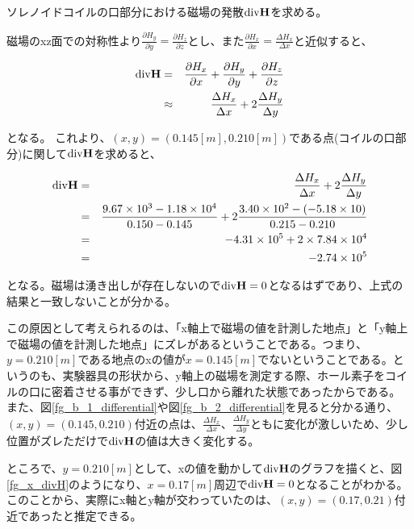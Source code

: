 \documentclass[uplatex,11pt]{jsarticle}
\newcommand{\fr}[1]{図\ref{fg_#1}}
\begin{document}
ソレノイドコイルの口部分における磁場の発散${\rm div} {\bf H}$を求める。

磁場のxz面での対称性より$\frac{\partial H_y}{\partial y} = \frac{\partial H_z}{\partial z}$とし、また$\frac{\partial H_x}{\partial x} = \frac{\Delta H_x}{\Delta x}$と近似すると、

\begin{eqnarray*}
    {\rm div} {\bf H} & = & \frac{\partial H_x}{\partial x} + \frac{\partial H_y}{\partial y} + \frac{\partial H_z}{\partial z} \\
                      & \approx & \frac{\Delta H_x}{\Delta x} + 2\frac{\Delta H_y}{\Delta y}
\end{eqnarray*}

となる。
これより、$(x, y) = (0.145[m], 0.210[m])$である点(コイルの口部分)に関して${\rm div} {\bf H}$を求めると、

\begin{eqnarray*}
    {\rm div} {\bf H} & = & \frac{\Delta H_x}{\Delta x} + 2\frac{\Delta H_y}{\Delta y} \\
                      & = & \frac{9.67 \times 10^3 - 1.18 \times 10^4}{0.150 - 0.145} + 2\frac{3.40 \times 10 ^2 - (-5.18 \times 10)}{0.215 - 0.210} \\
                      & = & -4.31 \times 10^5 + 2 \times 7.84 \times 10 ^ 4 \\
                      & = & - 2.74 \times 10^5
\end{eqnarray*}

となる。磁場は湧き出しが存在しないので${\rm div} {\bf H} = 0$となるはずであり、上式の結果と一致しないことが分かる。

この原因として考えられるのは、「x軸上で磁場の値を計測した地点」と「y軸上で磁場の値を計測した地点」にズレがあるということである。つまり、$y=0.210[m]$である地点のxの値が$x=0.145[m]$でないということである。というのも、実験器具の形状から、y軸上の磁場を測定する際、ホール素子をコイルの口に密着させる事ができず、少し口から離れた状態であったからである。
また、\fr{b_1_differential}や\fr{b_2_differential}を見ると分かる通り、$(x, y) = (0.145, 0.210)$付近の点は、$\frac{\Delta H_x}{\Delta x}$、$\frac{\Delta H_y}{\Delta y}$ともに変化が激しいため、少し位置がズレただけで${\rm div} {\bf H}$の値は大きく変化する。

ところで、$y=0.210[m]$として、xの値を動かして${\rm div} {\bf H}$のグラフを描くと、\fr{x_divH}のようになり、$x=0.17[m]$周辺で${\rm div} {\bf H} = 0$となることがわかる。
このことから、実際にx軸とy軸が交わっていたのは、$(x, y) = (0.17, 0.21)$付近であったと推定できる。
\end{document}
